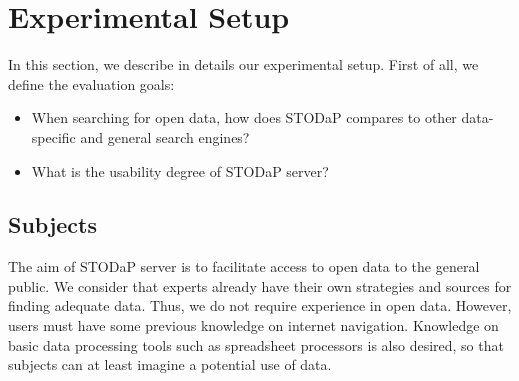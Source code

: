 \section{Experimental Setup}
\label{sec:setup}


In this section, we describe in details our experimental setup.
First of all, we define the evaluation goals:
\begin{itemize}
	\item When searching for open data, how does STODaP compares to other data-specific and general search engines?
	\item What is the usability degree of STODaP server?
\end{itemize}

\subsection{Subjects}

The aim of STODaP server is to facilitate access to open data to the general public.
We consider that experts already have their own strategies and sources for finding adequate data.
Thus, we do not require experience in open data.
However, users must have some previous knowledge on internet navigation. 
Knowledge on basic data processing tools such as spreadsheet processors is also desired, so that subjects can at least imagine a potential use of data.

